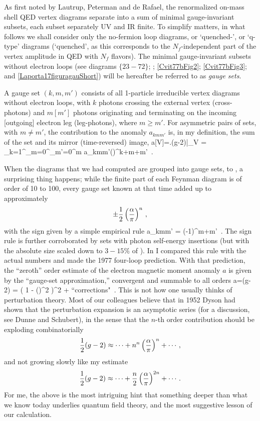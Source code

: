 As first noted by Lautrup, Peterman and de Rafael, the
renormalized on-mass shell QED vertex diagrams separate into a sum of
minimal gauge-invariant subsets, each subset separately UV and IR finite.
To simplify matters, in what follows we shall consider only the
no-fermion loop diagrams, or `quenched-', or `q-type' diagrams
(`quenched', as this corresponds to the $N_f$-independent part of the
vertex amplitude in
QED with $N_f$ flavors).
The minimal gauge-invariant subsets without electron loops (see
 diagrams $\{23-72\}$; ;
\ref{Cvit77bFig2}; \ref{Cvit77bFig3}; and \ref{Laporta17figuragauShort})
will be hereafter be referred to as \emph{gauge sets}.

A gauge set
$(k,m,m')$ consists of all 1-particle irreducible vertex diagrams
without electron loops, with $k$ photons crossing the external vertex
(cross-photons) and $m [m']$ photons originating and terminating on the
incoming [outgoing] electron leg (leg-photons), where $m\geq m'$. For
asymmetric pairs of sets, with $m\neq m'$, the contribution to the
anomaly $a_{kmm'}$ is, in my definition, the sum of the set and its
mirror (time-reversed) image,
\beq
a[V]=\left.(g-2)\right|_V
       =  \sum_{k=1}^\infty\sum_{m=0}^\infty\sum_{m'=0}^m
          a_{kmm'}\left(\frac{\alpha}{\pi}\right)^{k+m+m'}
\,.

When the diagrams that we had computed are grouped into
gauge sets,  to ,
a surprising thing happens; while the
finite part of each Feynman diagram is of order of 10 to 100, every
 gauge set known at that time added up to approximately
$$
		   \pm {1 \over 2} \left(\frac{\alpha}{\pi}\right)^n
\,,
$$
with the sign given by a simple empirical rule
\beq
a_{kmm'} = (-1)^{m+m'}
\,.
The sign rule is further corroborated by sets with photon
self-energy insertions (but with the absolute size scaled down to
$3-15\%$ of ).
In  I compared this rule with the actual numbers and
made the 1977 four-loop prediction.
With that prediction, the ``zeroth'' order estimate of the electron
magnetic moment anomaly $a$ is given by the ``gauge-set
approximation,'' convergent and summable to all orders
\beq
a=(g-2) =   \frac{\alpha}{\pi}
           {\left( 1 - \left(\frac{\alpha}{\pi}\right)^2
			\right)^2
		      } + \mbox{``corrections"}
\,.
This is not how one usually thinks of perturbation theory. Most of our
colleagues believe that in 1952 Dyson had  shown that the
perturbation expansion is an asymptotic series (for a discussion, see
Dunne and Schubert), in the sense that the $n$-th order
contribution should be exploding combinatorially
$$
{1 \over 2} (g-2) \approx
\cdots + n^n \left(\frac{\alpha}{\pi}\right)^n + \cdots
\,,
$$
and not growing slowly like my estimate
\[
{1 \over 2} (g-2) \approx
\cdots + \frac{n}{2}\left(\frac{\alpha}{\pi}\right)^{2n} + \cdots
\,.
\]
For me, the above is the most intriguing hint that something deeper than
what we know today underlies quantum field theory, and the most suggestive
lesson of our calculation.


